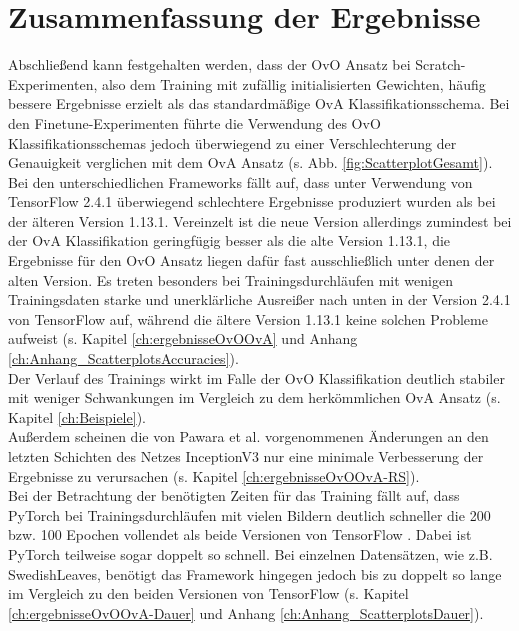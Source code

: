 \section{Zusammenfassung der Ergebnisse}
Abschließend kann festgehalten werden, dass der OvO Ansatz bei Scratch-Experimenten, also dem Training mit zufällig initialisierten Gewichten, häufig bessere Ergebnisse erzielt als das standardmäßige OvA Klassifikationsschema. Bei den Finetune-Experimenten führte die Verwendung des OvO Klassifikationsschemas jedoch überwiegend zu einer Verschlechterung der Genauigkeit verglichen mit dem OvA Ansatz (s. Abb. \ref{fig:ScatterplotGesamt}).\\

Bei den unterschiedlichen Frameworks fällt auf, dass unter Verwendung von TensorFlow 2.4.1 \cite{tensorflow} überwiegend schlechtere Ergebnisse produziert wurden als bei der älteren Version 1.13.1. Vereinzelt ist die neue Version allerdings zumindest bei der OvA Klassifikation geringfügig besser als die alte Version 1.13.1, die Ergebnisse für den OvO Ansatz liegen dafür fast ausschließlich unter denen der alten Version. Es treten besonders bei Trainingsdurchläufen mit wenigen Trainingsdaten starke und unerklärliche Ausreißer nach unten in der Version 2.4.1 von TensorFlow \cite{tensorflow} auf, während die ältere Version 1.13.1 keine solchen Probleme aufweist (s. Kapitel \ref{ch:ergebnisseOvOOvA} und Anhang \ref{ch:Anhang_ScatterplotsAccuracies}).\\

Der Verlauf des Trainings wirkt im Falle der OvO Klassifikation deutlich stabiler mit weniger Schwankungen im Vergleich zu dem herkömmlichen OvA Ansatz (s. Kapitel \ref{ch:Beispiele}).\\

Außerdem scheinen die von Pawara et al. \cite{pawaraWebsiteCode} vorgenommenen Änderungen an den letzten Schichten des Netzes InceptionV3 nur eine minimale Verbesserung der Ergebnisse zu verursachen (s. Kapitel \ref{ch:ergebnisseOvOOvA-RS}).\\

Bei der Betrachtung der benötigten Zeiten für das Training fällt auf, dass PyTorch \cite{pytorch} bei Trainingsdurchläufen mit vielen Bildern deutlich schneller die 200 bzw. 100 Epochen vollendet als beide Versionen von TensorFlow \cite{tensorflow}. Dabei ist PyTorch \cite{pytorch} teilweise sogar doppelt so schnell. Bei einzelnen Datensätzen, wie z.B. SwedishLeaves, benötigt das Framework hingegen jedoch bis zu doppelt so lange im Vergleich zu den beiden Versionen von TensorFlow \cite{tensorflow} (s. Kapitel \ref{ch:ergebnisseOvOOvA-Dauer} und Anhang \ref{ch:Anhang_ScatterplotsDauer}).\\\\
